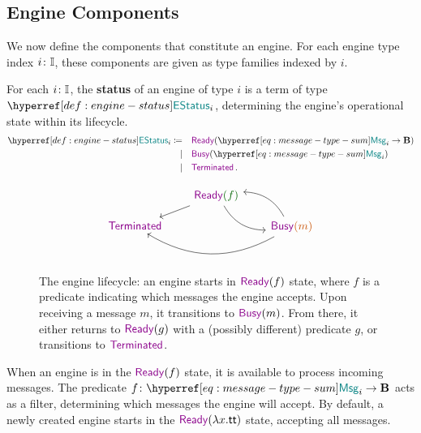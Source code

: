 \documentclass[
  a4paper,        %
  techreport,     %
]{art}
\begin{document}
\subsection{Engine Components}\label{sec:engine-components}

We now define the components that constitute an engine. For each engine type
index $i\colon\mathbb{I}$, these components are given as type families
indexed by $i$.

\begin{definition}\label{def:engine-status}%
For each $i\colon\mathbb{I}$, the \textbf{status} of an engine of type $i$ is
a term of type $\EngineStatus{i}$, determining the engine's operational state
within its lifecycle.
\begin{equation}\label{eq:engine-status}
\begin{aligned}
\typedef%
  {\EngineStatus{i}}%
  {    &\quad \ready{\msgtype{i} \to \Bool} \\%
  \mid & \quad \busy{\msgtype{i}} \\%
  \mid & \quad \terminated  \, .
  }
\end{aligned}
\end{equation}

\begin{figure}%
\centering
\[\begin{tikzcd}[row sep=1em, column sep=2em]
	& {\textcolor{darkgreen}{\ready{f}}} \\
	{\textcolor{darkred}{\terminated}} && {\textcolor{darkorange}{\busy{m}}}
	\arrow[from=1-2, to=2-1]
	\arrow[from=1-2, to=2-3, bend right]
	\arrow[from=2-3, to=1-2, bend right]
	\arrow[from=2-3, to=2-1, bend left]
\end{tikzcd}\]%
\caption{The engine lifecycle: an engine starts in $\ready{f}$ state, where $f$
is a predicate indicating which messages the engine accepts. Upon receiving a
message $m$, it transitions to $\busy{m}$. From there, it either returns to
$\ready{g}$ with a (possibly different) predicate $g$, or transitions to
$\terminated$.}
\label{fig:engine-status}
\end{figure}
\end{definition}

When an engine is in the $\ready{f}$ state, it is available to process incoming
messages. The predicate $\typing{f}{\msgtype{i} \to \Bool}$ acts as a filter,
determining which messages the engine will accept. By default, a newly created
engine starts in the $\ready{\lambda x.\mathsf{tt}}$ state, accepting all
messages.
\end{document}
